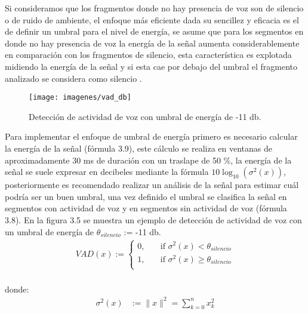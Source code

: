 Si consideramos que los fragmentos donde no hay presencia de voz son de silencio o de ruido de ambiente, el enfoque m\'as eficiente dada su sencillez y eficacia es el de definir un umbral para el nivel de energ\'ia, se asume que para los segmentos en donde no hay presencia de voz la energ\'ia de la señal aumenta considerablemente en comparaci\'on con los fragmentos de silencio, esta caracter\'istica es explotada midiendo la energ\'ia de la señal y si esta cae por debajo del umbral el fragmento analizado se considera como silencio \cite{beigi2011}.\\

\begin{figure}[H]
	\begin{center}
	\texttt{[image: imagenes/vad\_db]} \\
	\caption{Detecci\'on de actividad de voz con umbral de energ\'ia de -11 db.}
	\label{fig:diag_recon_locutor}
	\end{center}
\end{figure}

Para implementar el enfoque de umbral de energ\'ia primero es necesario calcular la energ\'ia de la señal (f\'ormula 3.9), este c\'alculo se realiza en ventanas de aproximadamente 30 ms de duraci\'on con un traslape de 50 \%, la energ\'ia de la señal se suele expresar en decibeles mediante la f\'ormula $10\log_{10}(\sigma^2(x))$, posteriormente es recomendado realizar un an\'alisis de la señal para estimar cu\'al podr\'ia ser un buen umbral, una vez definido el umbral se clasifica la señal en segmentos con actividad de voz y en segmentos sin actividad de voz (f\'ormula 3.8). En la figura 3.5 se muestra un ejemplo de detecci\'on de actividad de voz con un umbral de energ\'ia de $\theta_{silencio}$ := -11 db.\\

\begin{align}  
VAD(x) := 
	\begin{cases}
		0, &\quad\text{if } \sigma^2(x) < \theta_{silencio}\\
		1, &\quad\text{if } \sigma^2(x) \ge \theta_{silencio}\\
	\end{cases}
\end{align}\\

donde:\\

\begin{align}
   \sigma^2(x) &:= \lVert x \rVert^2  =  \sum_{k=0}^n x_k^2
\end{align}\\

